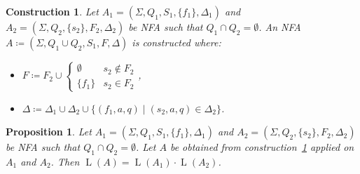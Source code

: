 \documentclass{article}
\newtheorem{proposition}[definition]{Proposition}
\newtheorem{construction}[definition]{Construction}
\DeclareMathOperator{\Lang}{L}
\begin{document}
	\begin{construction} \label{constr:NFA_concat_right}
		Let $A_1 = (\Sigma, Q_1, S_1, \{f_1\}, \Delta_1)$ and $A_2 = (\Sigma, Q_2, \{s_2\}, F_2, \Delta_2)$ be NFA such that $Q_1\cap Q_2 = \emptyset$.
		An NFA $A \coloneq (\Sigma, Q_1\cup Q_2, S_1, F, \Delta)$ is constructed where:
		\begin{itemize}
			\item \( F \coloneq F_2\cup
			\begin{cases}
				\emptyset & s_2\notin F_2 \\
				\{f_1\} & s_2\in F_2
			\end{cases}
			\),
			\item \( \Delta \coloneq \Delta_1\cup \Delta_2\cup \{ (f_1, a, q)\mid (s_2, a, q)\in \Delta_2 \} \).
		\end{itemize}
	\end{construction}
	\begin{proposition} \label{prop:constr:NFA_concat_right}
		Let $A_1 = (\Sigma, Q_1, S_1, \{f_1\}, \Delta_1)$ and $A_2 = (\Sigma, Q_2, \{s_2\}, F_2, \Delta_2)$ be NFA such that $Q_1\cap Q_2 = \emptyset$. Let $A$ be obtained from construction~\ref{constr:NFA_concat_right} applied on $A_1$ and $A_2$.
		Then $\Lang(A) = \Lang(A_1)\cdot\Lang(A_2)$.
	\end{proposition}
\iffalse
	\begin{construction} \label{constr:NFA_concat_left}
		Let $A_1 = (\Sigma, Q_1, S_1, \{f_1\}, \Delta_1)$ and $A_2 = (\Sigma, Q_2, \{s_2\}, F_2, \Delta_2)$ be NFA such that $Q_1\cap Q_2 = \emptyset$. We construct a NFA $A = (\Sigma, Q_1\cup Q_2, S, F_2, \Delta)$ where:
		\begin{itemize}
			\item \( S = S_1\cup
			\begin{cases}
				\emptyset & f_1\notin S_1 \\
				\{s_2\} & f_1\in S_1
			\end{cases}
			\),
			\item \( \Delta = \Delta_1\cup \Delta_2\cup \{ (q, a, s_2)\mid (q, a, f_1)\in \Delta_1 \} \).
		\end{itemize}
	\end{construction}
	Clearly, in both constructions~(\ref{constr:NFA_concat_right} and \ref{constr:NFA_concat_left}), $\Lang(A) = \Lang(A_1)\cdot\Lang(A_2)$.
\fi
\end{document}
